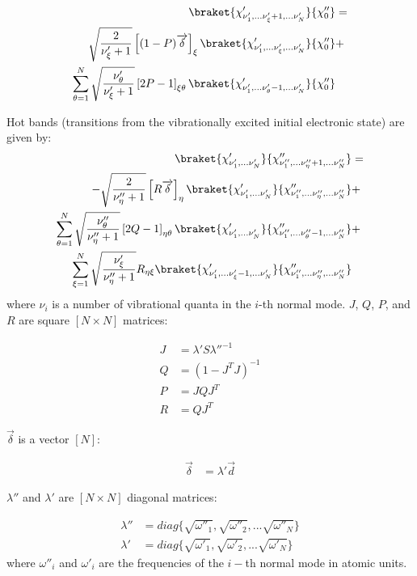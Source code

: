 \documentclass[11pt]{article}
\begin{document}
\begin{align}
\braket{ \chi'_{\nu'_1,...\nu'_{\xi}+1,...\nu'_N} }{\chi''_0}&=\nonumber\\
\sqrt{\frac{2}{\nu'_{\xi}+1}} \left[ (1-P)\overrightarrow{\delta}\right]_{\xi} 
\braket{ \chi'_{\nu'_1,...\nu'_{\xi},...\nu'_N} }{\chi''_0}&+\nonumber\\
\sum_{\theta=1}^{N} \sqrt{\frac{\nu'_{\theta}}{\nu'_{\xi}+1}}  \left[ 2P-1\right]_{\xi\theta}
\braket{ \chi'_{\nu'_1,...\nu'_{\theta}-1,...\nu'_N} }{\chi''_0}&
\end{align}

Hot bands (transitions from the vibrationally excited initial electronic state) are 
given by:
\begin{align}
\braket{ \chi'_{\nu'_1,...\nu'_N} }{ \chi''_{\nu''_1,...\nu''_{\eta}+1,...\nu''_N} }&=\nonumber\\
-\sqrt{\frac{2}{\nu''_{\eta}+1}} \left[ R\overrightarrow{\delta} \right]_{\eta}
\braket{ \chi'_{\nu'_1,...\nu'_N} }{ \chi''_{\nu''_1,...\nu''_{\eta},...\nu''_N} }&+\nonumber\\
\sum_{\theta=1}^{N}   \sqrt{ \frac{\nu''_{\theta}}{\nu''_{\eta}+1} }   \left[ 2Q-1 \right]_{\eta\theta}
\braket{ \chi'_{\nu'_1,...\nu'_N} }{ \chi''_{\nu''_1,...\nu''_{\theta}-1,...\nu''_N} }&+\nonumber\\
\sum_{\xi=1}^{N}   \sqrt{ \frac{\nu'_{\xi}}{\nu''_{\eta}+1} }   R_{\eta\xi}
\braket{ \chi'_{\nu'_1,...\nu'_{\xi}-1,...\nu'_N} }{ \chi''_{\nu''_1,...\nu''_{\eta},...\nu''_N} }&
\end{align}
where $\nu_i$ is a number of vibrational quanta in the $i$-th normal mode.
$J$, $Q$, $P$, and $R$ are square $[N\times N]$ matrices:

\begin{align}
J&=\lambda' S \lambda''^{-1}\nonumber\\
Q&=(1-J^TJ)^{-1}\nonumber\\
P&=JQJ^T\nonumber\\
R&=QJ^T\nonumber
\end{align}

$\overrightarrow{\delta}$ is a vector $[N]$:

\begin{align}
\overrightarrow{\delta}&=\lambda'\overrightarrow{d}\nonumber
\end{align}

$\lambda''$ and $\lambda'$ are $[N\times N]$ diagonal matrices:

\begin{align}
\lambda''&=diag\{\sqrt{\omega''_1},\sqrt{\omega''_2},... \sqrt{\omega''_N}\}\nonumber\\
\lambda'&=diag\{\sqrt{\omega'_1},\sqrt{\omega'_2},... \sqrt{\omega'_N}\}\nonumber
\end{align}
where $\omega''_i$ and $\omega'_i$ are the frequencies of the $i-$th normal mode in atomic units.
\end{document}
